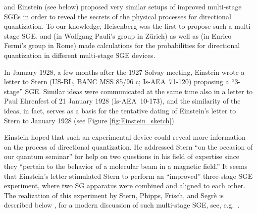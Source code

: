 \documentclass[12pt]{article}
\begin{document}
\cite{HeisenbergW1927Inhalt} and Einstein (see below) proposed very similar setups of improved multi-stage SGEs in order to reveal the secrets of the physical processes for directional quantization. To our knowledge, Heisenberg was the first to propose such a multi-stage SGE. \cite{HeisenbergW1927Inhalt} and \cite{GuettingerP1932Verhalten}  (in Wolfgang Pauli's group in Zürich) as well as \cite{MajoranaE1932Atomi} (in Enrico Fermi's group in Rome) made calculations for the probabilities for directional quantization in different multi-stage SGE devices. 

In January 1928, a few months after the 1927 Solvay meeting, Einstein wrote a letter to Stern (US-BL, BANC MSS 85/96 c; Is-AEA~71-120) proposing a ``3-stage'' SGE. Similar ideas were communicated at the same time also in a letter to Paul Ehrenfest of 21 January 1928 (Is-AEA~10-173), and the similarity of the ideas, in fact, serves as a basis for the tentative dating of Einstein's letter to Stern to January 1928 (see Figure \ref{fig:Einstein_sketch}).


Einstein hoped that such an experimental device could reveal more information on the process of directional quantization. He addressed Stern ``on the occasion of our quantum seminar'' for help on two  questions in his field of expertise since they ``pertain to the behavior of a molecular beam in a magnetic field.'' It seems that Einstein's letter stimulated Stern to perform an ``improved'' three-stage SGE experiment, where two SG apparatus were combined and aligned to each other. The realization of this experiment by Stern, Phipps, Frisch, and Segrè is described below \citep{PhippsTEtal1932Einstellung,FrischOEtal1933Einstellung}, for a modern discussion of such multi-stage SGE, see, e.g.\ \cite[ch.~XIII]{BohmA1993Mechanics}. 
\end{document}
